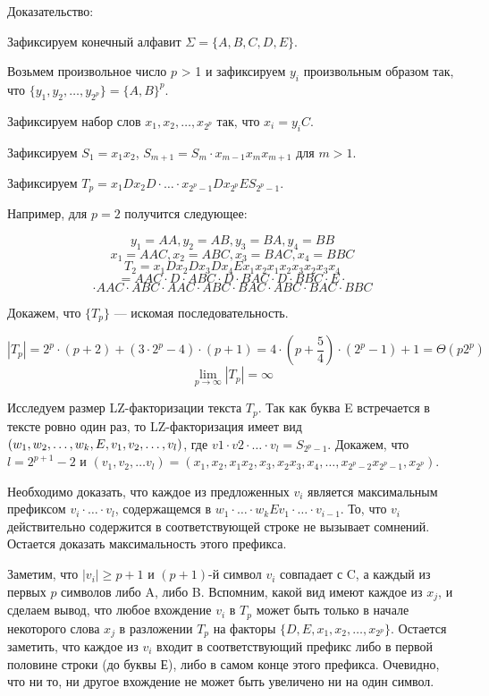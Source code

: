 \documentclass[14pt]{article}
\begin{document}
{\sc Доказательство:}

	Зафиксируем конечный алфавит $\Sigma = \{A, B, C, D, E\}$.

	Возьмем произвольное число $p$ > 1 и зафиксируем $y_i$ произвольным образом так, что $\{y_1, y_2, \ldots, y_{2^p}\} = \{A, B\}^p$.

	Зафиксируем набор слов $x_1, x_2, \ldots, x_{2^p}$ так, что $x_i=y_iC$.

	Зафиксируем $S_1=x_1x_2$, $S_{m+1}=S_m \cdot x_{m-1}x_mx_{m+1}$ для $m > 1$.

	Зафиксируем $T_p = x_1Dx_2D \cdot \ldots \cdot x_{2^p-1}Dx_{2^p}ES_{2^p-1}$.

	Например, для $p=2$ получится следующее:

	\[ y_1=AA, y_2=AB, y_3=BA, y_4=BB \]
	\[ x_1=AAC, x_2=ABC, x_3=BAC, x_4=BBC \]
	\[ T_2=x_1Dx_2Dx_3Dx_4Ex_1x_2x_1x_2x_3x_2x_3x_4 \]
	\[ = AAC \cdot D \cdot ABC \cdot D \cdot BAC \cdot D \cdot BBC \cdot E \cdot \]
	\[ \cdot AAC \cdot ABC \cdot AAC \cdot ABC \cdot BAC \cdot ABC \cdot BAC \cdot BBC \]

	Докажем, что $\{T_p\}$ --- искомая последовательность.

	\[ |T_p| = 2^p \cdot (p+2) + (3 \cdot 2^p - 4) \cdot (p+1) = 4 \cdot (p+\frac{5}{4}) \cdot (2^p-1) +1 = \Theta(p2^p) \]
	\[ \lim_{p \to \infty}|T_p| = \infty \]

	Исследуем размер LZ-факторизации текста $T_p$. Так как буква E встречается в тексте ровно один раз, то
	LZ-факторизация имеет вид $(w_1, w_2, \ldots, w_k,\\
	E, v_1, v_2, \ldots, v_l)$, где $v1 \cdot v2 \cdot \ldots \cdot v_l = S_{2^p-1}$.
	Докажем, что $l = 2^{p+1}-2$ и $(v_1, v_2, \ldots v_l) = (x_1, x_2, x_1x_2, x_3, x_2x_3, x_4, \ldots, x_{2^p-2}x_{2^p-1}, x_{2^p})$.

	Необходимо доказать, что каждое из предложенных $v_i$ является максимальным префиксом $v_i \cdot \ldots \cdot v_l$,
	содержащемся в $w_1 \cdot \ldots \cdot w_kEv_1 \cdot \ldots \cdot v_{i-1}$. То, что $v_i$ действительно содержится в соответствующей строке
	не вызывает сомнений. Остается доказать максимальность этого префикса.

	Заметим, что $|v_i| \geq p + 1$ и $(p+1)$-й символ $v_i$ совпадает с C, а каждый из первых $p$ символов либо A, либо B.
	Вспомним, какой вид имеют каждое из $x_j$, и сделаем вывод, что любое вхождение $v_i$ в $T_p$ может быть только в начале
	некоторого слова $x_j$ в разложении $T_p$ на факторы $\{D, E, x_1, x_2, \ldots, x_{2^p}\}$. Остается заметить, что
	каждое из $v_i$ входит в соответствующий префикс либо в первой половине строки (до буквы Е), либо в самом конце этого префикса.
	Очевидно, что ни то, ни другое вхождение не может быть увеличено ни на один символ.
\end{document}
